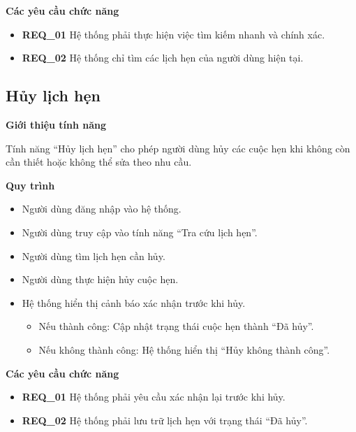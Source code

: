 \noindent \textbf{Các yêu cầu chức năng}
\begin{itemize}
  \item \textbf{REQ\_01} Hệ thống phải thực hiện việc tìm kiếm nhanh và chính xác.
  \item \textbf{REQ\_02} Hệ thống chỉ tìm các lịch hẹn của người dùng hiện tại.
\end{itemize}

\subsection{Hủy lịch hẹn}

\noindent \textbf{Giới thiệu tính năng}

Tính năng ``Hủy lịch hẹn'' cho phép người dùng hủy các cuộc hẹn khi không còn cần thiết hoặc không thể sửa theo nhu cầu.

\noindent \textbf{Quy trình}
\begin{itemize}
  \item Người dùng đăng nhập vào hệ thống.
  \item Người dùng truy cập vào tính năng ``Tra cứu lịch hẹn''.
  \item Người dùng tìm lịch hẹn cần hủy.
  \item Người dùng thực hiện hủy cuộc hẹn.
  \item Hệ thống hiển thị cảnh báo xác nhận trước khi hủy.
    \begin{itemize}
      \item Nếu thành công: Cập nhật trạng thái cuộc hẹn thành ``Đã hủy''.
      \item Nếu không thành công: Hệ thống hiển thị ``Hủy không thành công''.
    \end{itemize}
\end{itemize}

\noindent \textbf{Các yêu cầu chức năng}
\begin{itemize}
  \item \textbf{REQ\_01} Hệ thống phải yêu cầu xác nhận lại trước khi hủy.
  \item \textbf{REQ\_02} Hệ thống phải lưu trữ lịch hẹn với trạng thái ``Đã hủy''.
\end{itemize}